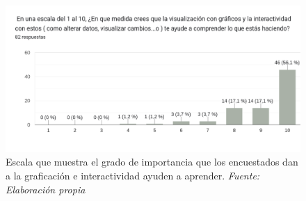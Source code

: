 \begin{figure}[H]
	\centering
	\includegraphics[width=1\textwidth]{img/appendixA/11_importancia_interactividad.png}
	\caption[Escala que muestra el grado de importancia que los encuestados dan a la graficación e interactividad ayuden a aprender.]{Escala que muestra el grado de importancia que los encuestados dan a la graficación e interactividad ayuden a aprender. \textit{Fuente: Elaboración propia}}
	\label{fig:app1_importancia_interactividad}  %
\end{figure}

